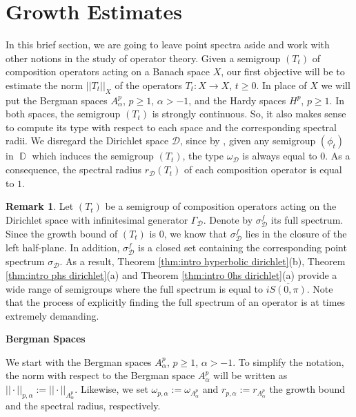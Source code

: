 \documentclass[11pt]{amsart}
\numberwithin{equation}{section}
\newcommand{\hiddennumberedsubsection}[1]{%
	\refstepcounter{subsection}%
	\subsectionmark{#1}%
	\noindent\textbf{\thesubsection\quad #1}%
}
\theoremstyle{definition}
\newtheorem{remark}[theorem]{Remark}
\DeclareMathOperator{\D}{\mathbb{D}}
\begin{document}
	\section{\quad Growth Estimates}\label{sec:growth bounds}
	In this brief section, we are going to leave point spectra aside and work with other notions in the study of operator theory. Given a semigroup $(T_t)$ of composition operators acting on a Banach space $X$, our first objective will be to estimate the norm $||T_t||_X$ of the operators $T_t:X\to X$, $t\ge0$. In place of $X$ we will put the Bergman spaces $A^p_\alpha$, $p\ge1$, $\alpha>-1$, and the Hardy spaces $H^p$, $p\ge1$. In both spaces, the semigroup $(T_t)$ is strongly continuous. So, it also makes sense to compute its type with respect to each space and the corresponding spectral radii. We disregard the Dirichlet space $\mathcal{D}$, since by \cite[Theorem 2]{Siskakis-Dirichlet}, given any semigroup $(\phi_t)$ in $\D$ which induces the semigroup $(T_t)$, the type $\omega_\mathcal{D}$ is always equal to $0$. As a consequence, the spectral radius $r_\mathcal{D}(T_t)$ of each composition operator is equal to $1$.
	
	\begin{remark}
		Let $(T_t)$ be a semigroup of composition operators acting on the Dirichlet space with infinitesimal generator $\Gamma_\mathcal{D}$. Denote by $\sigma_\mathcal{D}^f$ its full spectrum. Since the growth bound of $(T_t)$ is $0$, we know that $\sigma_\mathcal{D}^f$ lies in the closure of the left half-plane. In addition, $\sigma_\mathcal{D}^f$ is a closed set containing the corresponding point spectrum $\sigma_\mathcal{D}$. As a result, Theorem \ref{thm:intro hyperbolic dirichlet}(b), Theorem \ref{thm:intro phs dirichlet}(a) and Theorem \ref{thm:intro 0hs dirichlet}(a) provide a wide range of semigroups where the full spectrum is equal to $i\overline{S(0,\pi)}$. Note that the process of explicitly finding the full spectrum of an operator is at times extremely demanding.
	\end{remark}
	
	\hiddennumberedsubsection{Bergman Spaces}
	
	We start with the Bergman spaces $A^p_\alpha$, $p\ge1$, $\alpha>-1$. To simplify the notation, the norm with respect to the Bergman space $A^p_\alpha$ will be written as $||\cdot||_{p,\alpha}:=||\cdot||_{A^p_\alpha}$. Likewise, we set $\omega_{p,\alpha}:=\omega_{A^p_\alpha}$ and $r_{p,\alpha}:=r_{A^p_\alpha}$ the growth bound and the spectral radius, respectively.
	
\end{document}
